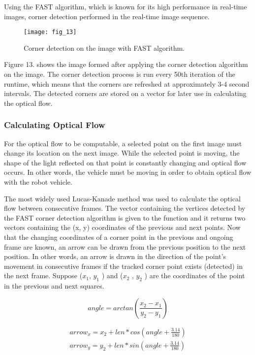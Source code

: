 \documentclass[twocolumn, switch]{article} %
\begin{document}
Using the FAST \cite{viswanathan2009features} algorithm, which is known for its high
performance in real-time images, corner detection performed
in the real-time image sequence.

\begin{figure}[h]
    \centering
    \texttt{[image: fig\_13]}
    \caption{Corner detection on the image with FAST algorithm.}
    \label{fig:fig13}
\end{figure}

Figure 13. shows the image formed after applying the corner
detection algorithm on the image. The corner detection
process is run every 50th iteration of the runtime, which
means that the corners are refreshed at approximately 3-4
second intervals. The detected corners are stored on a vector
for later use in calculating the optical flow.

\subsubsection{Calculating Optical Flow}

For the optical flow to be computable, a selected point on the
first image must change its location on the next image. While
the selected point is moving, the shape of the light reflected
on that point is constantly changing and optical flow occurs.
In other words, the vehicle must be moving in order to obtain
optical flow with the robot vehicle.

The most widely used Lucas-Kanade \cite{lucas1981iterative} method was used
to calculate the optical flow between consecutive frames.
The vector containing the vertices detected by the FAST
corner detection algorithm is given to the function and it
returns two vectors containing the (x, y) coordinates of the
previous and next points. Now that the changing coordinates
of a corner point in the previous and ongoing frame are
known, an arrow can be drawn from the previous position to
the next position. In other words, an arrow is drawn in the
direction of the point's movement in consecutive frames if
the tracked corner point exists (detected) in the next frame.
Suppose ($x_1$, $y_1$ ) and ($x_2$ , $y_2$ ) are the coordinates of the point
in the previous and next squares.

\begin{equation}
	angle = arctan\left( \frac{x_2-x_1}{y_2-y_1} \right)
\end{equation}

\begin{equation}
	\begin{split}
		arrow_x=x_2+len*cos\left(angle+\frac{3.14}{180} \right)\\
		arrow_y=y_2+len*sin\left(angle+\frac{3.14}{180} \right)
	\end{split}
\end{equation}
\end{document}
